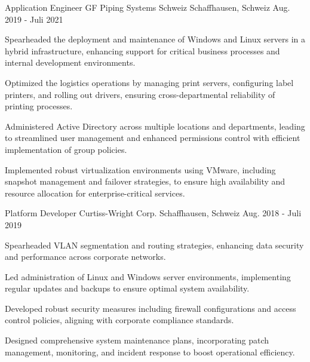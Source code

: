 \begin{cventries}
\cventry
  {Application Engineer}
  {GF Piping Systems Schweiz}
  {Schaffhausen, Schweiz}
  {Aug. 2019 - Juli 2021}
  {
    \begin{cvitems}
\item {Spearheaded the deployment and maintenance of Windows and Linux servers in a hybrid infrastructure, enhancing support for critical business processes and internal development environments.}
\item {Optimized the logistics operations by managing print servers, configuring label printers, and rolling out drivers, ensuring cross-departmental reliability of printing processes.}
\item {Administered Active Directory across multiple locations and departments, leading to streamlined user management and enhanced permissions control with efficient implementation of group policies.}
\item {Implemented robust virtualization environments using VMware, including snapshot management and failover strategies, to ensure high availability and resource allocation for enterprise-critical services.}
\end{cvitems}
  }

\cventry
  {Platform Developer}
  {Curtiss-Wright Corp.}
  {Schaffhausen, Schweiz}
  {Aug. 2018 - Juli 2019}
  {
    \begin{cvitems}
\item {Spearheaded VLAN segmentation and routing strategies, enhancing data security and performance across corporate networks.}
\item {Led administration of Linux and Windows server environments, implementing regular updates and backups to ensure optimal system availability.}
\item {Developed robust security measures including firewall configurations and access control policies, aligning with corporate compliance standards.}
\item {Designed comprehensive system maintenance plans, incorporating patch management, monitoring, and incident response to boost operational efficiency.}
\end{cvitems}
  }


\end{cventries}
